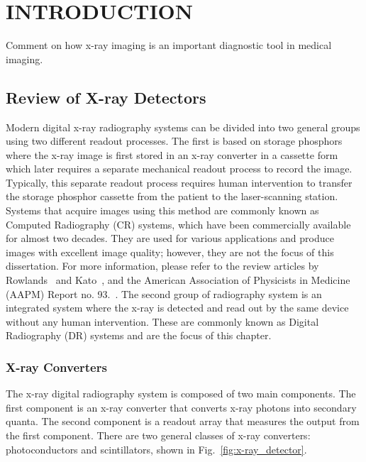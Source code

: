 \chapter{INTRODUCTION}
\label{chap:intro}

Comment on how x-ray imaging is an important diagnostic tool in medical imaging. 

\section{Review of X-ray Detectors}
\label{sect:review_x-ray_det}
Modern digital x-ray radiography systems can be divided into two general groups using two different readout processes.  The first is based on storage phosphors where the x-ray image is first stored in an x-ray converter in a cassette form which later requires a separate mechanical readout process to record the image.  Typically, this separate readout process requires human intervention to transfer the storage phosphor cassette from the patient to the laser-scanning station.  Systems that acquire images using this method are commonly known as Computed Radiography (CR) systems, which have been commercially available for almost two decades.  They are used for various applications and produce images with excellent image quality; however, they are not the focus of this dissertation.  For more information, please refer to the review articles by Rowlands~\citep{Rowlands2002} and Kato~\citep{kato1994}, and the American Association of Physicists in Medicine (AAPM) Report no. 93.~\citep{AAPM93}.  The second group of radiography system is an integrated system where the x-ray is detected and read out by the same device without any human intervention.  These are commonly known as Digital Radiography (DR) systems and are the focus of this chapter.

\subsection{X-ray Converters}
\label{subsect:x-ray_converters}
The x-ray digital radiography system is composed of two main components.  The first component is an x-ray converter that converts x-ray photons into secondary quanta.  The second component is a readout array that measures the output from the first component.  There are two general classes of x-ray converters: photoconductors and scintillators, shown in Fig.~\ref{fig:x-ray_detector}.

